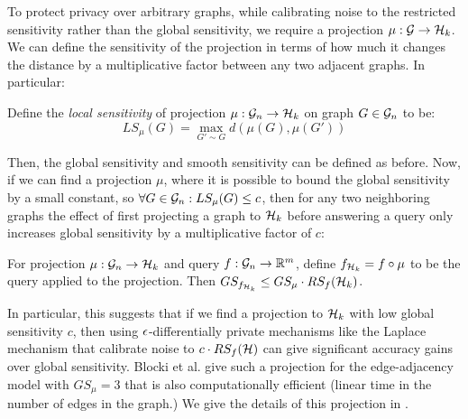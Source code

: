 To protect privacy over arbitrary graphs, while calibrating noise to the restricted sensitivity rather than the global sensitivity, we require a projection $\mu: \mathcal{G} \to \mathcal{H}_k$. We can define the sensitivity of the projection in terms of how much it changes the distance by a multiplicative factor between any two adjacent graphs. In particular:

\begin{definition}
Define the \emph{local sensitivity} of projection $\mu: \mathcal{G}_n\to \mathcal{H}_k$ on graph $G \in \mathcal{G}_n$ to be:
$$LS_\mu(G) = \max_{G' \sim G} d(\mu(G), \mu(G' )) $$ 
\end{definition} 



Then, the global sensitivity and smooth sensitivity can be defined as before. Now, if we can find a projection $\mu$, where it is possible to bound the global sensitivity by a small constant, so $\forall G \in \mathcal{G}_n: LS_{\mu} (G)\leq c$, then for any two neighboring graphs the effect of first projecting a graph to $\mathcal{H}_k$ before answering a query only increases global sensitivity by a multiplicative factor of $c$:

\begin{lemma}
\label{lemma:restricted_sensitivity_edge}
For projection $\mu: \mathcal{G} _n\to \mathcal{H}_k$ and query $f: \mathcal{G}_n \to \mathbb{R}^m$, define $f_{\mathcal{H}_k} = f \circ \mu$ to be the query applied to the projection. Then $GS_{f_{\mathcal{H}_k}} \leq GS_{\mu} \cdot RS_f(\mathcal{H}_k)$.
\end{lemma}
In particular, this suggests that if we find a projection to $\mathcal{H}_k$ with low global sensitivity $c$, then using $\epsilon$-differentially private mechanisms like the Laplace mechanism that calibrate noise to $c \cdot RS_f(\mathcal{H})$ can give significant accuracy gains over global sensitivity. Blocki et al. give such a projection for the edge-adjacency model with $GS_\mu = 3$ that is also computationally efficient (linear time in the number of edges in the graph.) We give the details of this projection in .

